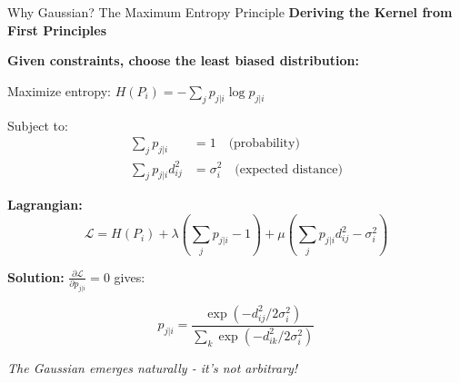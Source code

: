 \documentclass[10pt]{beamer}
\newcommand{\emphtext}[1]{\textcolor{upcblue}{\textbf{#1}}}
\begin{document}
\begin{frame}{Why Gaussian? The Maximum Entropy Principle}
\emphtext{Deriving the Kernel from First Principles}

\vspace{0.2cm}
\textbf{Given constraints, choose the least biased distribution:}

Maximize entropy: $H(P_i) = -\sum_j p_{j|i} \log p_{j|i}$

Subject to:
\begin{align}
\sum_j p_{j|i} &= 1 \quad \text{(probability)}\\
\sum_j p_{j|i} d_{ij}^2 &= \sigma_i^2 \quad \text{(expected distance)}
\end{align}

\textbf{Lagrangian:}
$$\mathcal{L} = H(P_i) + \lambda(\sum_j p_{j|i} - 1) + \mu(\sum_j p_{j|i} d_{ij}^2 - \sigma_i^2)$$

\textbf{Solution:} $\frac{\partial \mathcal{L}}{\partial p_{j|i}} = 0$ gives:

\begin{center}
\colorbox{green!10}{
\begin{minipage}{0.7\textwidth}
\centering
$$p_{j|i} = \frac{\exp(-d_{ij}^2/2\sigma_i^2)}{\sum_k \exp(-d_{ik}^2/2\sigma_i^2)}$$
\end{minipage}
}
\end{center}

\footnotesize
\textit{The Gaussian emerges naturally - it's not arbitrary!}
\end{frame}
\end{document}
